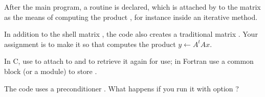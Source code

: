 \begin{exerciseframe}[shell]
  After the main program, a routine  is
  declared, which is attached by  to the matrix
   as the means of computing the product , for
  instance inside an iterative method.

  In addition to the shell matrix , the code also creates a
  traditional matrix . Your assignment is to make it so that
   computes the product $y\leftarrow A^tAx$.

  In C, use  to attach  to  and
   to retrieve it again for use; in Fortran use a
  common block (or a module) to store .

  The code uses a preconditioner . What happens if you run it
  with option ?
\end{exerciseframe}



